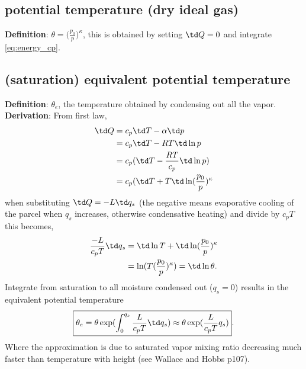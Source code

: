 \subsection{potential temperature (dry ideal gas)}
{\bf{Definition}}: $\theta = \big(\frac{p_0}{p}\big)^\kappa$, this is obtained by setting $\td Q=0$
and integrate \eqref{eq:energy_cp}. 

\subsection{(saturation) equivalent potential temperature}
{\bf{Definition}}: $\theta_e$, the temperature obtained by condensing out all the vapor. \\

{\bf{Derivation}}: From first law, 
\begin{equation}
\begin{aligned}
   \td Q & = c_p \td T - \alpha \td p \\ 
         & = c_p \td T - RT \td \ln p \\
         & = c_p( \td T - \frac{RT}{c_p} \td \ln p) \\
         & = c_p( \td T + T \td \ln(\frac{p_0}{p})^\kappa 
\end{aligned}
\end{equation}
when substituting $\td Q = -L\td q_{s}$ (the negative means evaporative cooling of the parcel when
$q_{s}$ increases, otherwise condensative heating) and divide by $c_p T$ this becomes, 
\begin{equation} \label{eq:saturationCooling}
\begin{aligned}
   \frac{-L}{c_pT} \td q_{s} & = \td \ln T + \td \ln(\frac{p_0}{p})^\kappa \\
          & = \ln (T(\frac{p_0}{p})^\kappa) = \td \ln \theta.
\end{aligned}
\end{equation}
Integrate from saturation to all moisture condensed out ($q_{s}=0$) results in the equivalent potential
temperature
\begin{equation}
\begin{aligned}
   \boxed{\theta_e = \theta\exp(\int_0^{q_{s}} \frac{L}{c_pT} \td q_{s}) 
         \approx \theta\exp(\frac{L}{c_pT} q_{s})}.
\end{aligned}
\end{equation}
Where the approximation is due to saturated vapor mixing ratio decreasing much faster than
temperature with height (see Wallace and Hobbs p107). 



